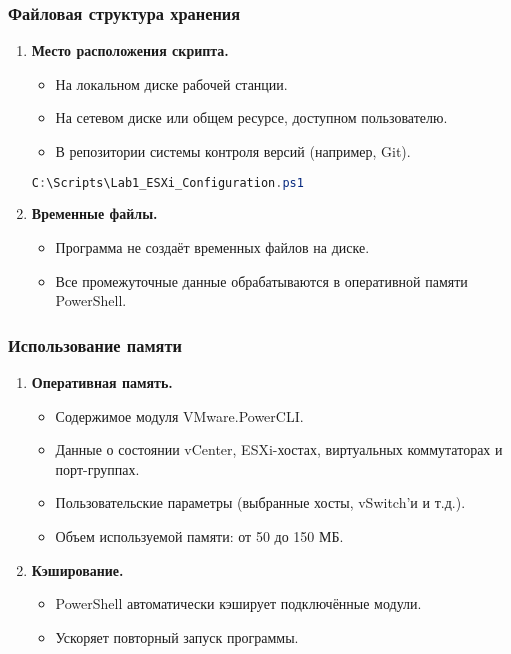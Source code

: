 \subsubsection{Файловая структура хранения}
\begin{enumerate}
    \item \textbf{Место расположения скрипта.}
    \begin{itemize}
        \item На локальном диске рабочей станции.
        \item На сетевом диске или общем ресурсе, доступном пользователю.
        \item В репозитории системы контроля версий (например, Git).
    \end{itemize}
    
    \begin{lstlisting}[language=PowerShell, basicstyle=\small\ttfamily, caption=Пример пути хранения]
C:\Scripts\Lab1_ESXi_Configuration.ps1
    \end{lstlisting}
    
    \item \textbf{Временные файлы.}
    \begin{itemize}
        \item Программа не создаёт временных файлов на диске.
        \item Все промежуточные данные обрабатываются в оперативной памяти PowerShell.
    \end{itemize}
\end{enumerate}

\subsubsection{Использование памяти}
\begin{enumerate}
    \item \textbf{Оперативная память.}
    \begin{itemize}
        \item Содержимое модуля VMware.PowerCLI.
        \item Данные о состоянии vCenter, ESXi-хостах, виртуальных коммутаторах и порт-группах.
        \item Пользовательские параметры (выбранные хосты, vSwitch'и и т.д.).
        \item Объем используемой памяти: от 50 до 150 МБ.
    \end{itemize}
    
    \item \textbf{Кэширование.}
    \begin{itemize}
        \item PowerShell автоматически кэширует подключённые модули.
        \item Ускоряет повторный запуск программы.
    \end{itemize}
\end{enumerate}

